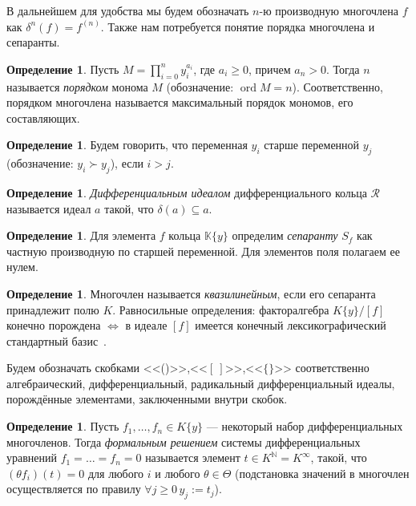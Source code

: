 \documentclass[16pt]{article}
\DeclareMathOperator{\ord}{ord}
\renewcommand{\ge}{\geqslant} %
\theoremstyle{plain}
\theoremstyle{definition}
\newtheorem{definition}[theorem]{Определение}
\theoremstyle{remark}
\begin{document}
В дальнейшем для удобства мы будем обозначать $n$-ю производную многочлена $f$ как $\delta^n(f)=f^{(n)}$. Также нам потребуется понятие порядка многочлена и сепаранты.
\begin{definition}
Пусть $M = \prod\limits_{i=0}^ny_i^{a_i}$, где $a_i \geqslant 0$, причем $a_n > 0$. Тогда $n$ называется \emph{порядком} монома $M$ (обозначение: $\ord M=n$). Соответственно, порядком многочлена называется максимальный порядок
мономов, его составляющих.
\end{definition}
\begin{definition}
Будем говорить, что переменная $y_i$ старше переменной $y_j$ (обозначение: $y_i \succ y_j$), если $i>j$.
\end{definition}
\begin{definition}
\emph{Дифференциальным идеалом} дифференциального кольца $\mathcal{R}$ называется идеал $a$ такой, что $\delta(a)\subseteq a$.
\end{definition}


\begin{definition}
Для элемента $f$ кольца $\mathbb{K}\{y\}$ определим \emph{сепаранту} $S_f$
как частную производную по старшей переменной. Для элементов поля полагаем ее нулем.
\end{definition}

\begin{definition} Многочлен называется \emph{квазилинейным}, если
его сепаранта принадлежит полю $K$. Равносильные определения:
факторалгебра $K\{y\}/[f]$ конечно порождена $\Leftrightarrow$ в
идеале $[f]$ имеется конечный лексикографический стандартный базис~\cite[теорема 2]{Ferro Theorem 2}.
\end{definition}



Будем обозначать скобками <<()>>,<<$[~]$>>,<<$\{\}$>> соответственно
алгебраический, дифференциальный, радикальный дифференциальный
идеалы, порождённые элементами, заключенными внутри скобок.


\begin{definition}
Пусть $f_1,\ldots,f_n\in K\{y\}$ --- некоторый набор
дифференциальных многочленов. Тогда \emph{формальным решением}
системы дифференциальных уравнений $f_1=\ldots =f_n=0$ называется
элемент $t\in K^{\mathbb{N}}= K^{\infty}$, такой, что $ (\theta f_i)(t)=0$ для
любого $i$ и любого $\theta\in\Theta$ (подстановка значений в
многочлен осуществляется по правилу $\forall j\ge 0 \, y_j:=t_j$).
\end{definition}
\end{document}
